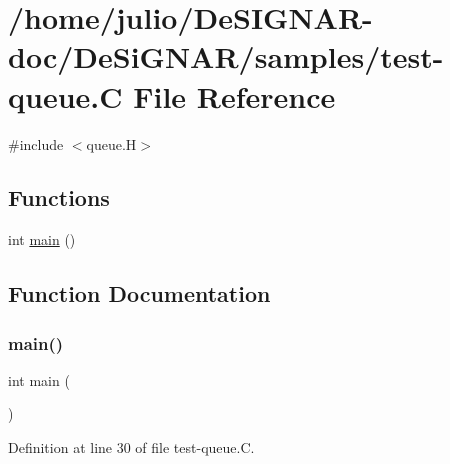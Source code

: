 \hypertarget{test-queue_8_c}{}\section{/home/julio/\+De\+S\+I\+G\+N\+A\+R-\/doc/\+De\+Si\+G\+N\+A\+R/samples/test-\/queue.C File Reference}
\label{test-queue_8_c}
{\ttfamily \#include $<$queue.\+H$>$}\newline
\subsection*{Functions}
\begin{DoxyCompactItemize}
\item 
int \hyperlink{test-queue_8_c_ae66f6b31b5ad750f1fe042a706a4e3d4}{main} ()
\end{DoxyCompactItemize}


\subsection{Function Documentation}
\mbox{\label{test-queue_8_c_ae66f6b31b5ad750f1fe042a706a4e3d4}} 
\subsubsection{\texorpdfstring{main()}{main()}}
{\footnotesize\ttfamily int main (\begin{DoxyParamCaption}{ }\end{DoxyParamCaption})}



Definition at line 30 of file test-\/queue.\+C.


